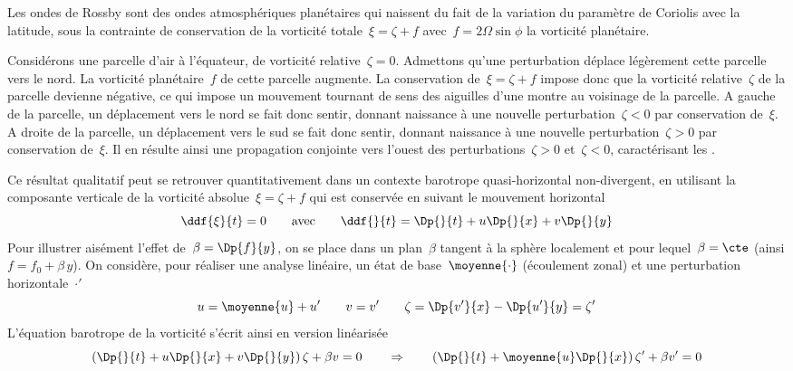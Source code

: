 \sk
Les ondes de Rossby sont des ondes atmosphériques planétaires qui
naissent du fait de la variation du paramètre de Coriolis avec la latitude,
sous la contrainte de conservation de la vorticité totale~$\xi = \zeta + f$
avec~$f=2\Omega\sin\phi$ la vorticité planétaire.

\sk
Considérons une parcelle d'air à l'équateur, de vorticité relative~$\zeta = 0$.
Admettons qu'une perturbation déplace légèrement cette parcelle vers le nord.
La vorticité planétaire~$f$ de cette parcelle augmente.
La conservation de~$\xi = \zeta + f$ impose donc
que la vorticité relative~$\zeta$ de la parcelle devienne négative,
ce qui impose un mouvement tournant de sens des aiguilles d'une montre
au voisinage de la parcelle.
A gauche de la parcelle, un déplacement vers le nord se fait
donc sentir, donnant naissance à une nouvelle perturbation~$\zeta < 0$ par conservation de~$\xi$.
A droite de la parcelle, un déplacement vers le sud se fait
donc sentir, donnant naissance à une nouvelle perturbation~$\zeta > 0$ par conservation de~$\xi$.
Il en résulte ainsi une propagation conjointe vers l'ouest 
des perturbations~$\zeta > 0$ et~$\zeta < 0$,
caractérisant les .

\sk
Ce résultat qualitatif peut se retrouver quantitativement
dans un contexte barotrope quasi-horizontal non-divergent,
en utilisant la composante verticale de la vorticité absolue~$\xi = \zeta + f$
qui est conservée en suivant le mouvement horizontal
\[ 
\ddf{\xi}{t} = 0 
\qquad
\textrm{avec}
\qquad
\ddf{}{t} = \Dp{}{t} + u \Dp{}{x} + v \Dp{}{y}
\]
Pour illustrer aisément l'effet de~$\beta = \Dp{f}{y}$,
on se place dans un plan~$\beta$ tangent à la sphère localement
et pour lequel~$\beta = \cte$ (ainsi $f = f_0 + \beta\,y$).
On considère, pour réaliser une analyse linéaire,
un état de base~$\moyenne{\cdot}$ (écoulement zonal)
et une perturbation horizontale~$\cdot'$
\[
u = \moyenne{u} + u' 
\qquad 
v = v' 
\qquad 
\zeta = \Dp{v'}{x} - \Dp{u'}{y} = \zeta'
\]
\noindent L'équation barotrope de la vorticité s'écrit ainsi en version linéarisée
\[ 
\left( \Dp{}{t} + u \Dp{}{x} + v \Dp{}{y} \right) \zeta + \beta v = 0
\qquad
\Rightarrow
\qquad
\left( \Dp{}{t} + \moyenne{u} \Dp{}{x} \right) \zeta' + \beta v' = 0
\]

